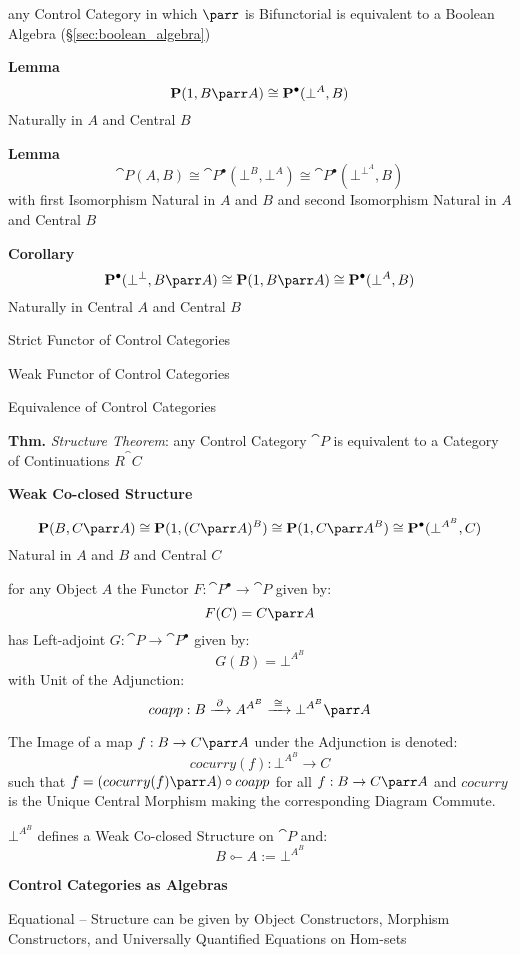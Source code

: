 any Control Category in which $\parr$ is Bifunctorial is equivalent to
a Boolean Algebra (\S\ref{sec:boolean_algebra})

\textbf{Lemma}
\[
  \cat{P}(1,B \parr A) \cong \cat{P}^\bullet(\bot^A,B)
\]
Naturally in $A$ and Central $B$

\textbf{Lemma}
\[
  \cat{P}(A,B) \cong \cat{P}^\bullet(\bot^B,\bot^A) \cong
  \cat{P}^\bullet(\bot^{\bot^A},B)
\]
with first Isomorphism Natural in $A$ and $B$ and second Isomorphism
Natural in $A$ and Central $B$ %

\textbf{Corollary}
\[
  \cat{P}^\bullet(\bot^\bot,B \parr A) \cong
  \cat{P}(1,B \parr A) \cong
  \cat{P}^\bullet(\bot^A,B)
\]
Naturally in Central $A$ and Central $B$


\asterism


Strict Functor of Control Categories

Weak Functor of Control Categories

Equivalence of Control Categories

\textbf{Thm.} \emph{Structure Theorem}: any Control Category $\cat{P}$
is equivalent to a Category of Continuations $R^\cat{C}$ %


\textbf{Weak Co-closed Structure}

\[
  \cat{P}(B,C \parr A) \cong \cat{P}(1,(C \parr A)^B) \cong
    \cat{P}(1,C \parr A^B) \cong
    \cat{P}^\bullet(\bot^{A^B},C)
\]
Natural in $A$ and $B$ and Central $C$

for any Object $A$ the Functor $F : \cat{P}^\bullet \rightarrow
\cat{P}$ given by:
\[
  F(C) = C \parr A
\]
has Left-adjoint $G : \cat{P} \rightarrow \cat{P}^\bullet$ given by:
\[
  G(B) = \bot^{A^B}
\]
with Unit of the Adjunction:
\[
  coapp : B \xrightarrow{\;\partial\;} A^{A^B} \xrightarrow{\;\cong\;}
    \bot^{A^B} \parr A
\]

The Image of a map $f : B \rightarrow C \parr A$ under the Adjunction
is denoted:
\[
  cocurry(f) : \bot^{A^B} \rightarrow C
\]
such that $f = (cocurry(f) \parr A) \circ coapp$ for all $f : B
\rightarrow C \parr A$ and $cocurry$ is the Unique Central Morphism
making the corresponding Diagram Commute.

$\bot^{A^B}$ defines a Weak Co-closed Structure on $\cat{P}$ and:
\[
  B \multimapinv A := \bot^{A^B}
\]


\textbf{Control Categories as Algebras}

Equational -- Structure can be given by Object Constructors, Morphism
Constructors, and Universally Quantified Equations on Hom-sets

